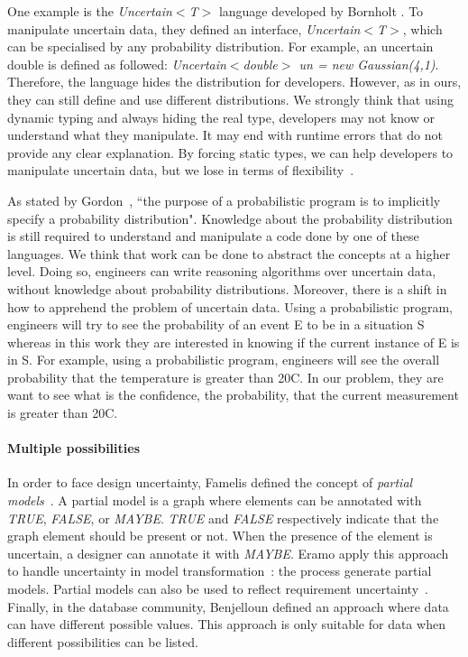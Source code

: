 One example is the \textit{Uncertain$<$T$>$} language developed by Bornholt \etal \cite{DBLP:conf/asplos/BornholtMM14}.
To manipulate uncertain data, they defined an interface, \textit{Uncertain$<$T$>$}, which can be specialised by any probability distribution.
For example, an uncertain double is defined as followed: \textit{Uncertain$<$double$>$ un = new Gaussian(4,1)}.
Therefore, the language hides the distribution for developers.
However, as in ours, they can still define and use different distributions.
We strongly think that using dynamic typing and always hiding the real type, developers may not know or understand what they manipulate.
It may end with runtime errors that do not provide any clear explanation.
By forcing static types, we can help developers to manipulate uncertain data, but we lose in terms of flexibility~\cite{Meijer2004StaticTW}.

As stated by Gordon~\etal\cite{DBLP:conf/icse/GordonHNR14}, ``the purpose of a probabilistic program is to implicitly specify a probability distribution".
Knowledge about the probability distribution is still required to understand and manipulate a code done by one of these languages.
We think that work can be done to abstract the concepts at a higher level.
Doing so, engineers can write reasoning algorithms over uncertain data, without knowledge about probability distributions.
Moreover, there is a shift in how to apprehend the problem of uncertain data.
Using a probabilistic program, engineers will try to see the probability of an event E to be in a situation S whereas in this work they are interested in knowing if the current instance of E is in S.
For example, using a probabilistic program, engineers will see the overall probability that the temperature is greater than 20\degree{}C.
In our problem, they are want to see what is the confidence, \ie the probability, that the current measurement is greater than 20\degree{}C.

\paragraph{Multiple possibilities}
In order to face design uncertainty, Famelis \etal defined the concept of \textit{partial models}~\cite{DBLP:conf/icse/FamelisSC12, DBLP:journals/sosym/FamelisC19}.
A partial model is a graph where elements can be annotated with \textit{TRUE}, \textit{FALSE}, or \textit{MAYBE}.
\textit{TRUE} and \textit{FALSE} respectively indicate that the graph element should be present or not.
When the presence of the element is uncertain, a designer can annotate it with \textit{MAYBE}.
Eramo \etal apply this approach to handle uncertainty in model transformation~\cite{DBLP:conf/sle/EramoPR15, DBLP:conf/icse/EramoPR14}: the process generate partial models.
Partial models can also be used to reflect requirement uncertainty~\cite{DBLP:journals/re/SalayCHS13}.
Finally, in the database community, Benjelloun \etal \cite{DBLP:conf/vldb/BenjellounSHW06} defined an approach where data can have different possible values.
This approach is only suitable for data when different possibilities can be listed.

